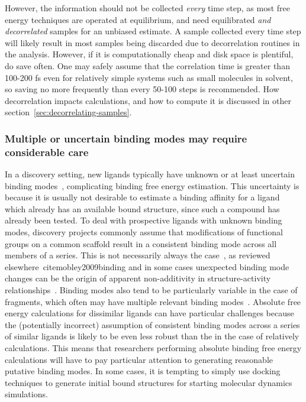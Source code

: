 \documentclass[9pt,bestpractices]{livecoms}
\begin{document}
However, the information should not be collected \textit{every} time step, as most free energy techniques are operated at equilibrium, and need equilibrated \textit{and decorrelated} samples for an unbiased estimate.
A sample collected every time step will likely result in most samples being discarded due to decorrelation routines in the analysis. However, if it is computationally cheap and disk space is plentiful, do save often. One may safely assume that the correlation time is greater than 100-200 fs even for relatively simple systems such as small molecules in solvent, so saving no more frequently than every 50-100 steps is recommended. 
How decorrelation impacts calculations, and how to compute it is discussed in other section~\ref{sec:decorrelating-samples}. 
%
\subsubsection{Multiple or uncertain binding modes may require considerable care}
\label{sec:multiple_binding_modes}
In a discovery setting, new ligands typically have unknown or at least uncertain binding modes~\cite{kaus2015how, plountprice2000analysis,mobley2009binding,calabro2016elucidation},  complicating binding free energy estimation.
This uncertainty is because it is usually not desirable to estimate a binding affinity for a ligand which already has an available bound structure, since such a compound has already been tested.
To deal with prospective ligands with unknown binding modes, discovery projects commonly assume that modifications of functional groups on a common scaffold result in a consistent binding mode across all members of a series.
This is not necessarily always the case~\cite{kaus2015how}, as reviewed elsewhere~cite{mobley2009binding} and in some cases unexpected binding mode changes can be the origin of apparent non-additivity in structure-activity relationships~\cite{calabro2016elucidation}.
Binding modes also tend to be particularly variable in the case of fragments, which often may have multiple relevant binding modes~\cite{}.
%
Absolute free energy calculations for dissimilar ligands can have particular challenges because the (potentially incorrect) assumption of consistent binding modes across a series of similar ligands is likely to be even less robust than the in the case of relatively calculations.
This means that researchers performing absolute binding free energy calculations will have to pay particular attention to generating reasonable putative binding modes.
%
In some cases, it is tempting to simply use docking techniques to generate initial bound structures for starting molecular dynamics simulations.
\end{document}
